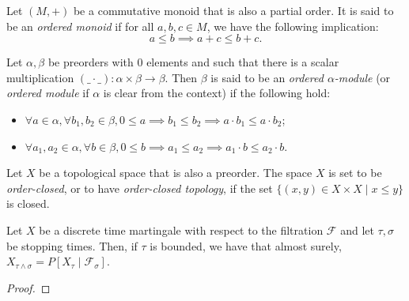 \begin{definition}\label{def:isOrderedAddMonoid}
  \mathlibok
Let $(M, +)$ be a commutative monoid that is also a partial order. It is said to be an \emph{ordered monoid} if for all $a, b, c \in M$, we have the following implication:
$$a \le b \implies a + c \le b + c.$$
\end{definition}

\begin{definition}\label{def:isOrderedModule}
  \mathlibok
Let $\alpha, \beta$ be preorders with $0$ elements and such that there is a scalar multiplication $(\_ \cdot \_) : \alpha \times \beta \to \beta$. Then $\beta$ is said to be an \emph{ordered $\alpha$-module} (or \emph{ordered module} if $\alpha$ is clear from the context) if the following hold:
\begin{itemize}
  \item $\forall a \in \alpha, \forall b_1, b_2 \in \beta, 0 \le a \implies b_1 \le b_2 \implies a \cdot b_1 \le a \cdot b_2$;
  \item $\forall a_1, a_2 \in \alpha, \forall b \in \beta, 0 \le b \implies a_1 \le a_2 \implies a_1 \cdot b \le a_2 \cdot b$.
\end{itemize}
\end{definition}

\begin{definition}\label{def:orderClosedTopology}
  \mathlibok
Let $X$ be a topological space that is also a preorder. The space $X$ is set to be \emph{order-closed}, or to have \emph{order-closed topology}, if the set $\{(x, y) \in X \times X \mid x \le y\}$ is closed.
\end{definition}

\begin{lemma}\label{lem:optionalSampling_discrete}
  \mathlibok
  Let $X$ be a discrete time martingale with respect to the filtration $\mathcal{F}$ and let
  $\tau, \sigma$ be stopping times. Then, if $\tau$ is bounded, we have that almost surely,
  $X_{\tau \wedge \sigma} = P[X_{\tau} \mid \mathcal{F}_{\sigma}]$.
\end{lemma}

\begin{proof}\leanok

\end{proof}

